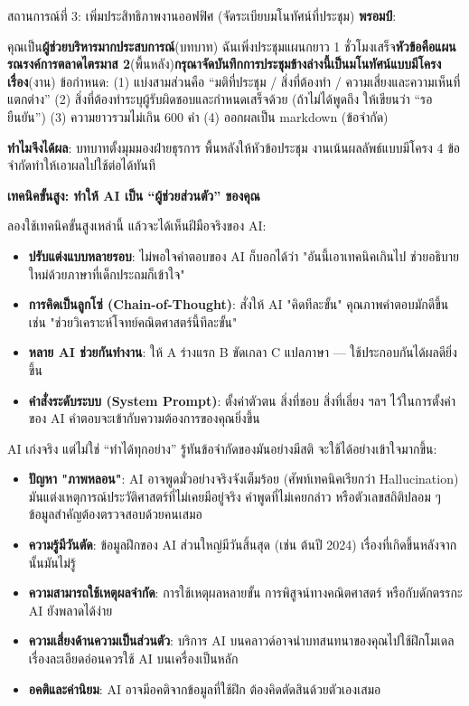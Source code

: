 \begin{tcbinfo}{สถานการณ์ที่ 3: เพิ่มประสิทธิภาพงานออฟฟิศ (จัดระเบียบมโนทัศน์ที่ประชุม)}
\textbf{พรอมป์}:

คุณเป็น\textbf{ผู้ช่วยบริหารมากประสบการณ์}(บทบาท) ฉันเพิ่งประชุมแผนกยาว 1 ชั่วโมงเสร็จ\textbf{หัวข้อคือแผนรณรงค์การตลาดไตรมาส 2}(พื้นหลัง)\textbf{กรุณาจัดบันทึกการประชุมข้างล่างนี้เป็นมโนทัศน์แบบมีโครงเรื่อง}(งาน) ข้อกำหนด: (1) แบ่งสามส่วนคือ “มติที่ประชุม / สิ่งที่ต้องทำ / ความเสี่ยงและความเห็นที่แตกต่าง” (2) สิ่งที่ต้องทำระบุผู้รับผิดชอบและกำหนดเสร็จด้วย (ถ้าไม่ได้พูดถึง ให้เขียนว่า “รอยืนยัน”) (3) ความยาวรวมไม่เกิน 600 คำ (4) ออกผลเป็น markdown (ข้อจำกัด)

\textbf{ทำไมจึงได้ผล}: บทบาทตั้งมุมมองฝ่ายธุรการ พื้นหลังให้หัวข้อประชุม งานเน้นผลลัพธ์แบบมีโครง 4 ข้อจำกัดทำให้เอาผลไปใช้ต่อได้ทันที

\end{tcbinfo}

\textbf{เทคนิคขั้นสูง: ทำให้ AI เป็น “ผู้ช่วยส่วนตัว” ของคุณ}\par

ลองใช้เทคนิคขั้นสูงเหล่านี้ แล้วจะได้เห็นฝีมือจริงของ AI:

\begin{itemize}
  \item \textbf{ปรับแต่งแบบหลายรอบ}: ไม่พอใจคำตอบของ AI ก็บอกได้ว่า "อันนี้เอาเทคนิคเกินไป ช่วยอธิบายใหม่ด้วยภาษาที่เด็กประถมก็เข้าใจ"
  \item \textbf{การคิดเป็นลูกโซ่ (Chain-of-Thought)}: สั่งให้ AI "คิดทีละขั้น" คุณภาพคำตอบมักดีขึ้น เช่น "ช่วยวิเคราะห์โจทย์คณิตศาสตร์นี้ทีละขั้น"
  \item \textbf{หลาย AI ช่วยกันทำงาน}: ให้ A ร่างแรก B ขัดเกลา C แปลภาษา — ใช้ประกอบกันได้ผลดียิ่งขึ้น
  \item \textbf{คำสั่งระดับระบบ (System Prompt)}: ตั้งค่าตัวตน สิ่งที่ชอบ สิ่งที่เลี่ยง ฯลฯ ไว้ในการตั้งค่าของ AI คำตอบจะเข้ากับความต้องการของคุณยิ่งขึ้น
\end{itemize}


AI เก่งจริง แต่ไม่ใช่ “ทำได้ทุกอย่าง” รู้ทันข้อจำกัดของมันอย่างมีสติ จะใช้ได้อย่างเข้าใจมากขึ้น:

\begin{itemize}
  \item \textbf{ปัญหา "ภาพหลอน"}: AI อาจพูดมั่วอย่างจริงจังเต็มร้อย (ศัพท์เทคนิคเรียกว่า Hallucination) มันแต่งเหตุการณ์ประวัติศาสตร์ที่ไม่เคยมีอยู่จริง คำพูดที่ไม่เคยกล่าว หรือตัวเลขสถิติปลอม ๆ ข้อมูลสำคัญต้องตรวจสอบด้วยคนเสมอ
  \item \textbf{ความรู้มีวันตัด}: ข้อมูลฝึกของ AI ส่วนใหญ่มีวันสิ้นสุด (เช่น ต้นปี 2024) เรื่องที่เกิดขึ้นหลังจากนั้นมันไม่รู้
  \item \textbf{ความสามารถใช้เหตุผลจำกัด}: การใช้เหตุผลหลายขั้น การพิสูจน์ทางคณิตศาสตร์ หรือกับดักตรรกะ AI ยังพลาดได้ง่าย
  \item \textbf{ความเสี่ยงด้านความเป็นส่วนตัว}: บริการ AI บนคลาวด์อาจนำบทสนทนาของคุณไปใช้ฝึกโมเดล เรื่องละเอียดอ่อนควรใช้ AI บนเครื่องเป็นหลัก
  \item \textbf{อคติและค่านิยม}: AI อาจมีอคติจากข้อมูลที่ใช้ฝึก ต้องคิดตัดสินด้วยตัวเองเสมอ
\end{itemize}

